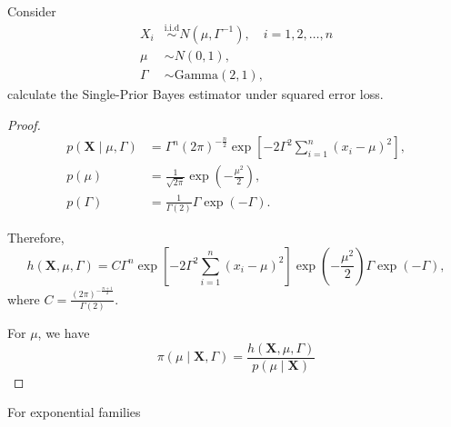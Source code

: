 \begin{example}
    Consider
    \begin{equation*}
        \begin{aligned}
            X_i    & \stackrel{\text{i.i.d}}{\sim}N(\mu,\Gamma^{-1}),\quad i=1,2,\ldots,n \\
            \mu    & \sim N(0,1),                                                         \\
            \Gamma & \sim\text{Gamma}(2,1),
        \end{aligned}
    \end{equation*}
    calculate the Single-Prior Bayes estimator under squared error loss.
\end{example}

\begin{proof}
    \begin{equation*}
        \begin{aligned}
            p\left(\textbf{X}\mid\mu,\Gamma\right) & =\Gamma^n(2\pi)^{-\frac{n}{2}}\exp\left[-2\Gamma^2\sum_{i=1}^{n}(x_i-\mu)^2\right], \\
            p(\mu)                                 & =\frac{1}{\sqrt{2\pi}}\exp\left(-\frac{\mu^2}{2}\right),                            \\
            p(\Gamma)                              & =\frac{1}{\Gamma(2)}\Gamma\exp\left(-\Gamma\right).
        \end{aligned}
    \end{equation*}

    Therefore,
    \begin{equation*}
        h\left(\textbf{X},\mu,\Gamma\right)=C\Gamma^n\exp\left[-2\Gamma^2\sum_{i=1}^{n}(x_i-\mu)^2\right]\exp\left(-\frac{\mu^2}{2}\right)\Gamma\exp\left(-\Gamma\right),
    \end{equation*}
    where $C=\frac{(2\pi)^{-\frac{n+1}{2}}}{\Gamma(2)}$.

    For $\mu$, we have
    \begin{equation*}
        \pi\left(\mu\mid\textbf{X},\Gamma\right)=\frac{h\left(\textbf{X},\mu,\Gamma\right)}{p(\mu\mid\textbf{X})}
    \end{equation*}
\end{proof}

For exponential families

\begin{theorem}

\end{theorem}

